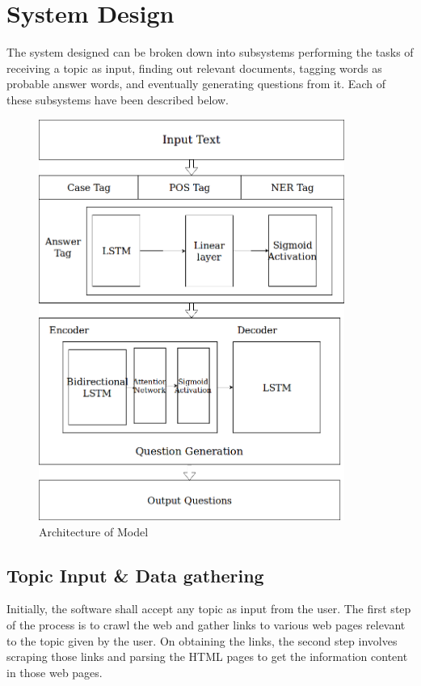 \chapter{System Design}

The system designed can be broken down into subsystems performing the tasks of receiving a topic as input, finding out relevant documents, tagging words as probable answer words, and eventually generating questions from it. Each of these subsystems have been described below. 

\begin{figure}
	\caption{Architecture of Model}
	\centering\includegraphics[width=10cm]{5.png}
\end{figure}

\section{Topic Input \& Data gathering}

Initially, the software shall accept any topic as input from the user. The
first step of the process is to crawl the web and gather links to various web pages relevant
to the topic given by the user. On obtaining the links, the second step involves 
scraping those links and parsing the HTML pages to get the information content in
those web pages.  

